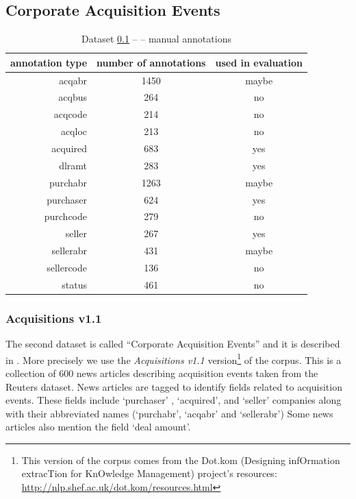 \subsection{Corporate Acquisition Events} \label{sec:ch40_corporate_acquisitions}

\begin{table}
\centering
\begin{tabular}{|r||c|c|}
\hline
\textbf{annotation type} & \textbf{number of annotations} & \textbf{used in evaluation}\\
\hline
\hline
acqabr & 1450 & maybe\\
\hline
acqbus & 264 & no\\
\hline
acqcode & 214 & no\\
\hline
acqloc & 213 & no\\
\hline
acquired & 683 & yes\\
\hline
dlramt & 283 & yes\\
\hline
purchabr & 1263 & maybe\\
\hline
purchaser & 624 & yes\\
\hline
purchcode & 279 & no\\
\hline
seller & 267 & yes\\
\hline
sellerabr & 431 & maybe\\
\hline
sellercode & 136 & no\\
\hline
status & 461 & no\\
\hline
\end{tabular}
\caption{Dataset \ref{sec:ch40_corporate_acquisitions} --  -- manual annotations} \label{tab:ch40_acquisitions}
\end{table}



\subsubsection{Acquisitions v1.1}  

The second dataset is called ``Corporate Acquisition Events'' and it is
described in \citep{lewis1992representation}. More precisely we use the \emph{Acquisitions v1.1} version\footnote{This version of the corpus comes from the Dot.kom (Designing infOrmation extracTion for KnOwledge Management) project's resources: \url{http://nlp.shef.ac.uk/dot.kom/resources.html}} of the corpus.
This is a collection of 600 news articles describing acquisition
events taken from the Reuters dataset. News articles are tagged to identify fields
related to acquisition events. These fields include `purchaser' , `acquired', and
`seller' companies along with their abbreviated names (`purchabr', `acqabr' and
`sellerabr') Some news articles also mention the field `deal amount'.



